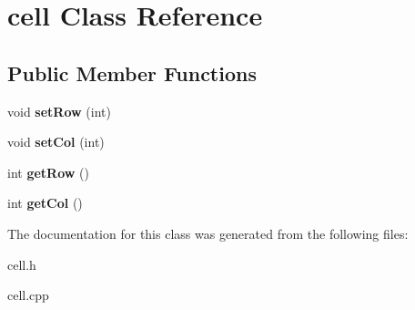 \hypertarget{classcell}{\section{cell \-Class \-Reference}
\label{classcell}
}
\subsection*{\-Public \-Member \-Functions}
\begin{DoxyCompactItemize}
\item 
\hypertarget{classcell_a422dc1ede28a31f9ad1e4b03168ca4e5}{void {\bfseries set\-Row} (int)}\label{classcell_a422dc1ede28a31f9ad1e4b03168ca4e5}

\item 
\hypertarget{classcell_ab169a29b834fe78d7ce1c96c259c69de}{void {\bfseries set\-Col} (int)}\label{classcell_ab169a29b834fe78d7ce1c96c259c69de}

\item 
\hypertarget{classcell_a9660d0348343e4091c81b6b58f1f85f9}{int {\bfseries get\-Row} ()}\label{classcell_a9660d0348343e4091c81b6b58f1f85f9}

\item 
\hypertarget{classcell_af2f1691276042a327c3d0b183a792720}{int {\bfseries get\-Col} ()}\label{classcell_af2f1691276042a327c3d0b183a792720}

\end{DoxyCompactItemize}


\-The documentation for this class was generated from the following files\-:\begin{DoxyCompactItemize}
\item 
cell.\-h\item 
cell.\-cpp\end{DoxyCompactItemize}

